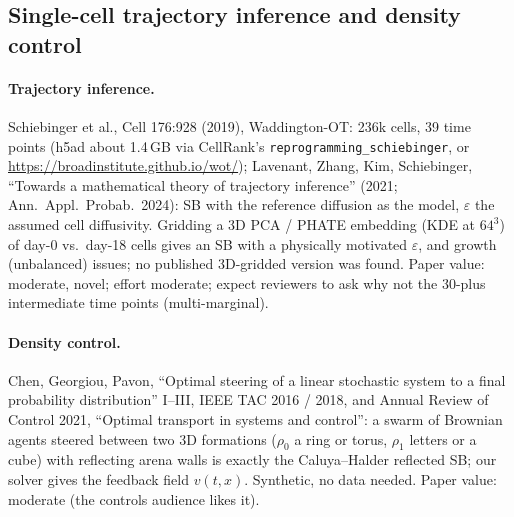 \documentclass[11pt]{article}
\newcommand{\eps}{\varepsilon}
\newcommand{\code}[1]{\texttt{#1}}
\begin{document}
\subsection{Single-cell trajectory inference and density control}

\paragraph{Trajectory inference.} Schiebinger et al., Cell 176:928 (2019),
Waddington-OT: 236k cells, 39 time points (h5ad about 1.4\,GB via CellRank's
\code{reprogramming\_schiebinger}, or \url{https://broadinstitute.github.io/wot/});
Lavenant, Zhang, Kim, Schiebinger, ``Towards a mathematical theory of trajectory
inference'' (2021; Ann.\ Appl.\ Probab.\ 2024): SB with the reference diffusion as
the model, $\eps$ the assumed cell diffusivity. Gridding a 3D PCA / PHATE embedding
(KDE at $64^3$) of day-0 vs.\ day-18 cells gives an SB with a physically motivated
$\eps$, and growth (unbalanced) issues; no published 3D-gridded version was found.
Paper value: moderate, novel; effort moderate; expect reviewers to ask why not the
30-plus intermediate time points (multi-marginal).

\paragraph{Density control.} Chen, Georgiou, Pavon, ``Optimal steering of a linear
stochastic system to a final probability distribution'' I--III, IEEE TAC 2016 / 2018,
and Annual Review of Control 2021, ``Optimal transport in systems and control'': a
swarm of Brownian agents steered between two 3D formations ($\rho_0$ a ring or torus,
$\rho_1$ letters or a cube) with reflecting arena walls is exactly the
Caluya--Halder reflected SB; our solver gives the feedback field $v(t,x)$. Synthetic,
no data needed. Paper value: moderate (the controls audience likes it).
\end{document}
